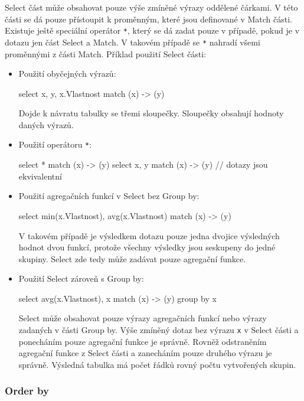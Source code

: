 Select část může obsahovat pouze výše zmíněné výrazy oddělené čárkami.
V této části se dá pouze přístoupit k proměnným, které jsou definované v Match části.
Existuje ještě speciální operátor \texttt{*}, který se dá zadat pouze v případě, pokud je v dotazu jen část Select a Match.
V takovém případě se \texttt{*} nahradí všemi proměnnými z části Match.
Příklad použití Select části:
\begin{itemize}
\item
Použití obyčejných výrazů:
\begin{code}
select x, y, x.Vlastnost match (x) -> (y)
\end{code}
Dojde k návratu tabulky se třemi sloupečky.
Sloupečky obsahují hodnoty daných výrazů.

\item
Použití operátoru \texttt{*}:
\begin{code}
select * match (x) -> (y)
select x, y match (x) -> (y) 
// dotazy jsou ekvivalentní
\end{code} 

\item
Použití agregačních funkcí v Select bez Group by:
\begin{code}
select min(x.Vlastnost), avg(x.Vlastnost) match (x) -> (y)
\end{code}
V takovém případě je výsledkem dotazu pouze jedna dvojice výsledných hodnot dvou funkcí, protože všechny výsledky jsou seskupeny do jedné skupiny.
Select zde tedy může zadávat pouze agregační funkce.

\item
Použití Select zároveň s Group by:
\begin{code}
select avg(x.Vlastnost), x match (x) -> (y) group by x
\end{code}
Select může obsahovat pouze výrazy agregačních funkcí nebo výrazy zadaných v části Group by.
Výše zmíněný dotaz bez výrazu \texttt{x} v Select části a ponecháním pouze agregační funkce je správně.
Rovněž odstraněním agregační funkce z Select části a zanecháním pouze druhého výrazu je správně.
Výsledná tabulka má počet řádků rovný počtu vytvořených skupin.
\end{itemize}

\subsubsection{Order by}

